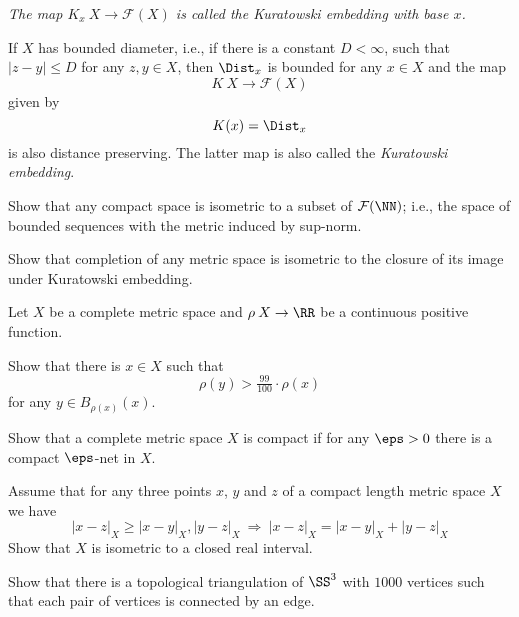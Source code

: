 {\it The map $K_x\: X\to\mathcal{F}(X)$ is called the \emph{Kuratowski embedding with base $x$}.

If $X$ has bounded diameter, i.e., if there is a constant $D<\infty$,
such that $|z-y|\le D$ for any $z,y\in X$,
then $\Dist_x$ is bounded for any $x\in X$
and the map 
$$K\:X\to\mathcal{F}(X)$$ given by 
$$K(x) = \Dist_x $$ 
is also distance preserving.
The latter map is also called the \emph{Kuratowski embedding}.}

\begin{pr}\label{pr:compact->F_N}
Show that any compact space is isometric to a subset of $\mathcal{F}(\NN)$;
i.e., the space of bounded sequences with the metric induced by sup-norm.
\end{pr}

\begin{pr}\label{pr:complition-kuratowski}
Show that completion of any metric space is isometric to the closure of its image under Kuratowski embedding.
\end{pr}

\begin{pr}\label{pr:almost-min}
Let $X$ be a complete metric space and $\rho\:X\to \RR$ be a continuous positive function.

Show that there is $x\in X$ such that
$$\rho(y)>\tfrac{99}{100}\cdot\rho(x)$$ 
for any $y\in B_{\rho(x)}(x)$.
\end{pr}

\begin{pr}\label{pr:compact-net}
Show that a complete metric space $X$ is compact if for any $\eps>0$ there is a compact $\eps$-net in $X$.  
\end{pr}






\begin{pr}\label{pr:trig-inq=>interval}
Assume that for any three points $x$, $y$ and $z$ of a compact length metric space $X$ we have 
$$|x-z|_X\ge |x-y|_X, |y-z|_X\ \Longrightarrow\  |x-z|_X= |x-y|_X+ |y-z|_X$$
Show that $X$ is isometric to a closed real interval.
\end{pr}


\begin{pr}\label{pr:1000}
Show that there is a topological triangulation of $\SS^3$
with $1000$ vertices such that each pair of vertices is connected by an edge. 
\end{pr}

